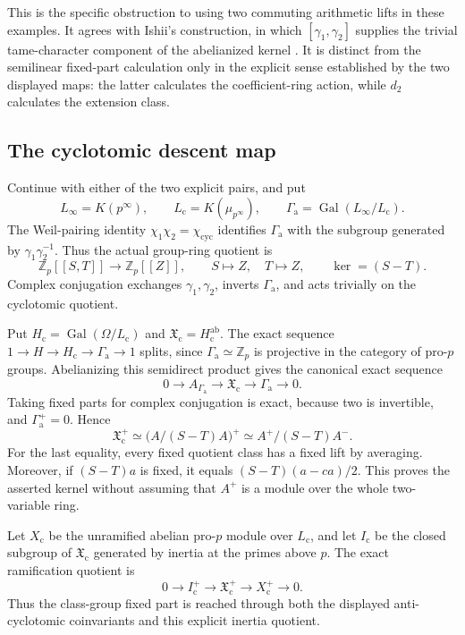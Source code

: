 This is the specific obstruction to using two commuting
arithmetic lifts in these examples. It agrees with Ishii's
construction, in which \([\gamma_1,\gamma_2]\) supplies the
trivial tame-character component of the abelianized kernel
\cite[\S4.1--4.2]{Ishii}. It is distinct from the
semilinear fixed-part calculation only in the explicit
sense established by the two displayed maps: the latter
calculates the coefficient-ring action, while \(d_2\)
calculates the extension class.

\subsection{The cyclotomic descent map}

Continue with either of the two explicit pairs, and put
\[
 L_\infty=K(p^\infty),\qquad
 L_{\mathrm c}=K(\mu_{p^\infty}),\qquad
 \Gamma_{\mathrm a}=\operatorname{Gal}(L_\infty/L_{\mathrm c}).
\]
The Weil-pairing identity \(\chi_1\chi_2=\chi_{\mathrm{cyc}}\)
identifies \(\Gamma_{\mathrm a}\) with the subgroup generated
by \(\gamma_1\gamma_2^{-1}\). Thus the actual group-ring quotient is
\[
 \mathbb Z_p[[S,T]]\longrightarrow\mathbb Z_p[[Z]],
 \qquad S\longmapsto Z,\quad T\longmapsto Z,
 \qquad \ker=(S-T).
\]
Complex conjugation exchanges \(\gamma_1,\gamma_2\), inverts
\(\Gamma_{\mathrm a}\), and acts trivially on the cyclotomic
quotient.

Put \(H_{\mathrm c}=\operatorname{Gal}(\Omega/L_{\mathrm c})\)
and \(\mathfrak X_{\mathrm c}=H_{\mathrm c}^{\mathrm{ab}}\).
The exact sequence
\(1\to H\to H_{\mathrm c}\to\Gamma_{\mathrm a}\to1\)
splits, since \(\Gamma_{\mathrm a}\simeq\mathbb Z_p\) is
projective in the category of pro-\(p\) groups. Abelianizing
this semidirect product gives the canonical exact sequence
\[
 0\longrightarrow A_{\Gamma_{\mathrm a}}
  \longrightarrow\mathfrak X_{\mathrm c}
  \longrightarrow\Gamma_{\mathrm a}\longrightarrow0.
\]
Taking fixed parts for complex conjugation is exact, because
two is invertible, and \(\Gamma_{\mathrm a}^+=0\). Hence
\[
 \mathfrak X_{\mathrm c}^+
 \simeq\bigl(A/(S-T)A\bigr)^+
 \simeq A^+/(S-T)A^- .
\]
For the last equality, every fixed quotient class has a
fixed lift by averaging. Moreover, if \((S-T)a\) is fixed,
it equals \((S-T)(a-ca)/2\). This proves the asserted kernel
without assuming that \(A^+\) is a module over the whole
two-variable ring.

Let \(X_{\mathrm c}\) be the unramified abelian pro-\(p\)
module over \(L_{\mathrm c}\), and let \(I_{\mathrm c}\)
be the closed subgroup of \(\mathfrak X_{\mathrm c}\)
generated by inertia at the primes above \(p\).
The exact ramification quotient is
\[
 0\longrightarrow I_{\mathrm c}^+
 \longrightarrow\mathfrak X_{\mathrm c}^+
 \longrightarrow X_{\mathrm c}^+\longrightarrow0.
\]
Thus the class-group fixed part is reached through both
the displayed anti-cyclotomic coinvariants and this
explicit inertia quotient.


